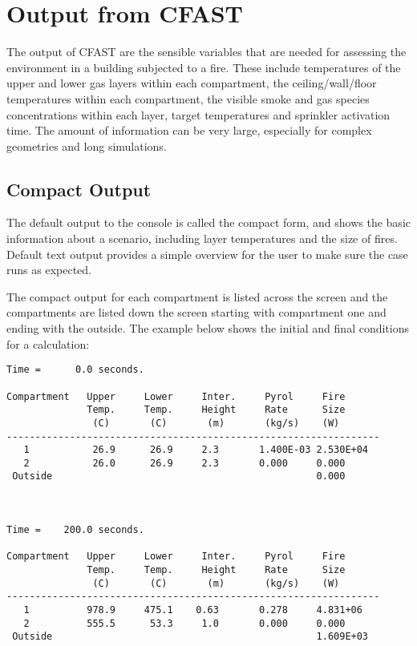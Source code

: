 \chapter{Output from CFAST}

The output of CFAST are the sensible variables that are needed for assessing the environment in a building subjected to a fire. These include temperatures of the upper and lower gas layers within each compartment, the ceiling/wall/floor temperatures within each compartment, the visible smoke and gas species concentrations within each layer, target temperatures and sprinkler activation time.  The amount of information can be very large, especially for complex geometries and long simulations.

\section{Compact Output}

The default output to the console is called the compact form, and shows the basic information about a scenario, including layer temperatures and the size of fires. Default text output provides a simple overview for the user to make sure the case runs as expected.  

The compact output for each compartment is listed across the screen and the compartments are listed down the screen starting with compartment one and ending with the outside.  The example below shows the initial and final conditions for a calculation:

\begin{lstlisting}[basicstyle=\tiny]
Time =      0.0 seconds.

Compartment   Upper     Lower     Inter.     Pyrol     Fire
              Temp.     Temp.     Height     Rate      Size        
               (C)       (C)       (m)       (kg/s)    (W)
-----------------------------------------------------------------
   1           26.9      26.9     2.3       1.400E-03 2.530E+04
   2           26.0      26.9     2.3       0.000     0.000    
 Outside                                              0.000    



Time =    200.0 seconds.

Compartment   Upper     Lower     Inter.     Pyrol     Fire
              Temp.     Temp.     Height     Rate      Size        
               (C)       (C)       (m)       (kg/s)    (W)
-----------------------------------------------------------------
   1          978.9     475.1    0.63       0.278     4.831+06
   2          555.5      53.3     1.0       0.000     0.000    
 Outside                                              1.609E+03
\end{lstlisting}


